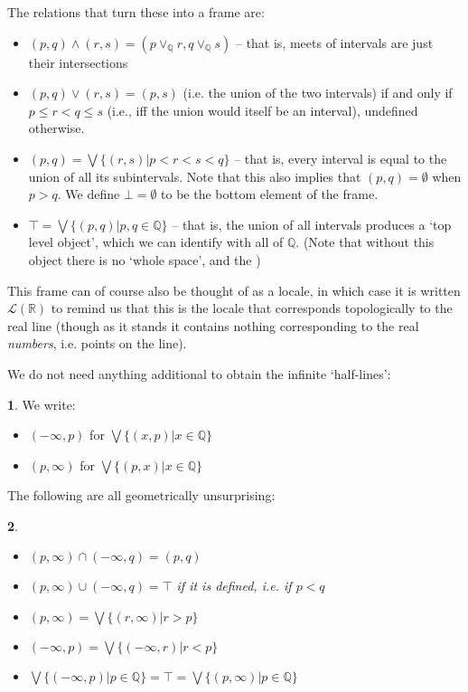 \documentclass[oneside,english]{amsbook}
\numberwithin{section}{chapter}
\theoremstyle{plain}
\newtheorem{thm}{\protect\theoremname}
\theoremstyle{definition}
\newtheorem{defn}[thm]{\protect\definitionname}
\providecommand{\definitionname}{Definition}
\providecommand{\theoremname}{Theorem}
\begin{document}
The relations that turn these into a frame are:
\begin{itemize}
	\item{$(p, q)\land(r, s) = (p\lor_\mathbb{Q} r, q\lor_\mathbb{Q} s)$ -- that is, meets of intervals are just their intersections}
	\item{$(p, q)\lor(r, s) = (p, s)$ (i.e. the union of the two intervals) if and only if $p\le r < q\le s$ (i.e., iff the union would itself be an interval), undefined otherwise.}
	\item{$(p, q) = \bigvee \{(r,s)|p<r<s<q\}$ -- that is, every interval is equal to the union of all its subintervals. Note that this also implies that $(p, q)=\emptyset$ when $p>q$. We define $\bot = \emptyset$ to be the bottom element of the frame.}
	\item{$\top = \bigvee \{(p, q)|p, q\in \mathbb{Q}\}$ -- that is, the union of all intervals produces a `top level object', which we can identify with all of $\mathbb{Q}$. (Note that without this object there is no `whole space', and the )}
\end{itemize}

This frame can of course also be thought of as a locale, in which case it is written $\mathscr{L}(\mathbb{R})$ to remind us that this is the locale that corresponds topologically to the real line (though as it stands it contains nothing corresponding to the real \emph{numbers}, i.e. points on the line). 

We do not need anything additional to obtain the infinite `half-lines':
\begin{defn}
	We write:
	\begin{itemize}
		\item{$(-\infty, p)$ for $\bigvee \{(x, p)|x\in \mathbb{Q}\}$}
		\item{$(p, \infty)$ for $\bigvee \{(p, x)|x\in \mathbb{Q}\}$}
	\end{itemize}
\end{defn}

The following are all geometrically unsurprising:

\begin{thm}
	\begin{itemize}
		\item{$(p, \infty)\cap (-\infty, q) = (p, q)$}
		\item{$(p, \infty)\cup (-\infty, q) = \top$ if it is defined, i.e. if $p<q$}
		\item{$(p, \infty)= \bigvee \{(r, \infty)|r > p\}$}
		\item{$(-\infty, p)= \bigvee \{(-\infty, r)|r < p\}$}
		\item{$\bigvee \{(-\infty, p)| p\in \mathbb{Q}\} = \top = \bigvee \{(p, \infty)| p\in \mathbb{Q}\}$}
	\end{itemize}
\end{thm}
\end{document}

